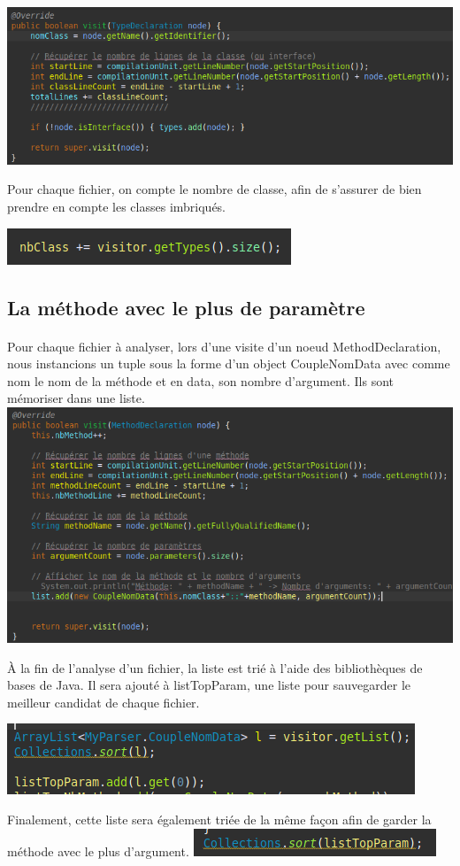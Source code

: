 \documentclass[a4paper]{article}
\begin{document}
\begin{multicols}{2}
        \noindent\includegraphics[width=.47\textwidth]{visiteur/visitTypeDeclaration}

        Pour chaque fichier, on compte le nombre de classe, afin de s'assurer de bien prendre en compte les classes imbriqués.

        \noindent\includegraphics[width=.47\textwidth]{visiteur/comptage}
        \subsection{La méthode avec le plus de paramètre}
        \paragraph{} Pour chaque fichier à analyser, lors d'une visite d'un noeud MethodDeclaration, nous instancions un tuple sous la forme d'un object CoupleNomData avec comme nom le nom de la méthode et en data, son nombre d'argument. Ils sont mémoriser dans une liste. 
        \noindent\includegraphics[width=.47\textwidth]{visiteur/visitMethod}
        
        À la fin de l'analyse d'un fichier, la liste est trié à l'aide des bibliothèques de bases de Java. Il sera ajouté à listTopParam, une liste pour sauvegarder le meilleur candidat de chaque fichier. 
        
        \noindent\includegraphics[width=.47\textwidth]{visiteur/sort1}

        Finalement, cette liste sera également triée de la même façon afin de garder la méthode avec le plus d'argument.
        \noindent\includegraphics[width=.47\textwidth]{visiteur/sort2}


\end{multicols}
\end{document}
